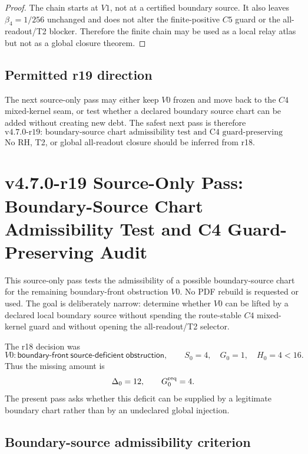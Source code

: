\begin{proof}
The chain starts at \(V1\), not at a certified boundary source.  It also leaves
\(\beta_4=1/256\) unchanged and does not alter the finite-positive \(C5\) guard
or the all-readout/T2 blocker.  Therefore the finite chain may be used as a
local relay atlas but not as a global closure theorem.
\end{proof}

\subsection{Permitted r19 direction}
\label{subsec:v470-r18-permitted-r19-direction}

The next source-only pass may either keep \(V0\) frozen and move back to the
\(C4\) mixed-kernel seam, or test whether a declared boundary source chart can
be added without creating new debt.  The safest next pass is therefore
\[
\boxed{
\text{v4.7.0-r19: boundary-source chart admissibility test and C4 guard-preserving audit.}
}
\]
No RH, T2, or global all-readout closure should be inferred from r18.



\section{v4.7.0-r19 Source-Only Pass: Boundary-Source Chart Admissibility Test and C4 Guard-Preserving Audit}
\label{sec:v470-r19-boundary-source-chart-c4-guard}

This source-only pass tests the admissibility of a possible boundary-source
chart for the remaining boundary-front obstruction \(V0\).  No PDF rebuild is
requested or used.  The goal is deliberately narrow: determine whether \(V0\)
can be lifted by a declared local boundary source without spending the
route-stable \(C4\) mixed-kernel guard and without opening the all-readout/T2
selector.

The r18 decision was
\[
V0:\mathsf{boundary\mbox{-}front\ source\mbox{-}deficient\ obstruction},
\qquad
S_0=4,\quad G_0=1,\quad H_0=4<16.
\]
Thus the missing amount is
\[
\Delta_0=12,
\qquad
G_0^{\rm req}=4.
\]
The present pass asks whether this deficit can be supplied by a legitimate
boundary chart rather than by an undeclared global injection.

\subsection{Boundary-source admissibility criterion}
\label{subsec:v470-r19-boundary-source-admissibility-criterion}

